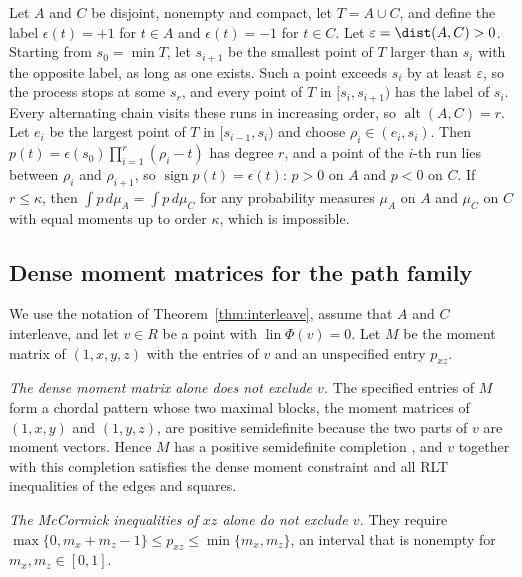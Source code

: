 Let $A$ and $C$ be disjoint, nonempty and compact, let $T=A\cup C$, and define
the label $\epsilon(t)=+1$ for $t\in A$ and $\epsilon(t)=-1$ for $t\in C$. Let
$\varepsilon=\dist(A,C)>0$. Starting from $s_0=\min T$, let $s_{i+1}$ be the
smallest point of $T$ larger than $s_i$ with the opposite label, as long as
one exists. Such a point exceeds $s_i$ by at least $\varepsilon$, so the
process stops at some $s_r$, and every point of $T$ in $[s_i,s_{i+1})$ has the
label of $s_i$. Every alternating chain visits these runs in increasing
order, so $\operatorname{alt}(A,C)=r$. Let $e_i$ be the largest point of $T$
in $[s_{i-1},s_i)$ and choose $\rho_i\in(e_i,s_i)$. Then
$p(t)=\epsilon(s_0)\prod_{i=1}^r(\rho_i-t)$ has degree $r$, and a point of the
$i$-th run lies between $\rho_i$ and $\rho_{i+1}$, so $\operatorname{sign}p(t)=\epsilon(t)$:
$p>0$ on $A$ and $p<0$ on $C$. If $r\le\kappa$, then $\int p\,d\mu_A=\int p\,d\mu_C$
for any probability measures $\mu_A$ on $A$ and $\mu_C$ on $C$ with equal
moments up to order $\kappa$, which is impossible.

\subsection{Dense moment matrices for the path family}\label{app:sdp}

We use the notation of Theorem~\ref{thm:interleave}, assume that $A$ and $C$
interleave, and let $v\in R$ be a point with $\operatorname{lin}\Phi(v)=0$. Let
$M$ be the moment matrix of $(1,x,y,z)$ with the entries of $v$ and an
unspecified entry $p_{xz}$.

\emph{The dense moment matrix alone does not exclude $v$.} The specified
entries of $M$ form a chordal pattern whose two maximal blocks, the moment
matrices of $(1,x,y)$ and $(1,y,z)$, are positive semidefinite because the two
parts of $v$ are moment vectors. Hence $M$ has a positive semidefinite
completion \citep{GroneEtAl1984}, and $v$ together with this completion
satisfies the dense moment constraint and all RLT inequalities of the edges
and squares.

\emph{The McCormick inequalities of $xz$ alone do not exclude $v$.} They
require $\max\{0,m_x+m_z-1\}\le p_{xz}\le\min\{m_x,m_z\}$, an interval that is
nonempty for $m_x,m_z\in[0,1]$.

